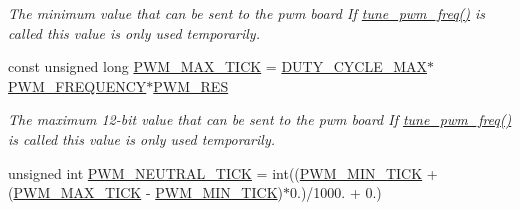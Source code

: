 \begin{DoxyCompactItemize}
\begin{DoxyCompactList}\small\item\em The minimum value that can be sent to the pwm board If \hyperlink{svea__arduino__src_8h_ab3d64504be0ebfe1754aec5485ddbb72}{tune\+\_\+pwm\+\_\+freq()} is called this value is only used temporarily. \end{DoxyCompactList}\item 
const unsigned long \hyperlink{group__ActuationToOutput_ga5538377a8c17947a2f35bfd31e7399fa}{P\+W\+M\+\_\+\+M\+A\+X\+\_\+\+T\+I\+CK} = \hyperlink{group__ActuationToOutput_ga716fdda2246d4b15a6b8d32444ac8439}{D\+U\+T\+Y\+\_\+\+C\+Y\+C\+L\+E\+\_\+\+M\+AX}$\ast$\hyperlink{group__ActuationToOutput_ga1e7ca795ca78a0b20f4fbc06ea505cfb}{P\+W\+M\+\_\+\+F\+R\+E\+Q\+U\+E\+N\+CY}$\ast$\hyperlink{group__ActuationToOutput_ga3de5d6c408f667c395ab2b236e059724}{P\+W\+M\+\_\+\+R\+ES}\hypertarget{group__ActuationToOutput_ga5538377a8c17947a2f35bfd31e7399fa}{}\label{group__ActuationToOutput_ga5538377a8c17947a2f35bfd31e7399fa}

\begin{DoxyCompactList}\small\item\em The maximum 12-\/bit value that can be sent to the pwm board If \hyperlink{svea__arduino__src_8h_ab3d64504be0ebfe1754aec5485ddbb72}{tune\+\_\+pwm\+\_\+freq()} is called this value is only used temporarily. \end{DoxyCompactList}\item 
unsigned int \hyperlink{group__ActuationToOutput_gaa6aecad7bb848a436df0b7c89aa1f48f}{P\+W\+M\+\_\+\+N\+E\+U\+T\+R\+A\+L\+\_\+\+T\+I\+CK} = int((\hyperlink{group__ActuationToOutput_ga606bf90e7566da13c2e4c3d2ef163e6b}{P\+W\+M\+\_\+\+M\+I\+N\+\_\+\+T\+I\+CK} + (\hyperlink{group__ActuationToOutput_ga5538377a8c17947a2f35bfd31e7399fa}{P\+W\+M\+\_\+\+M\+A\+X\+\_\+\+T\+I\+CK} -\/ \hyperlink{group__ActuationToOutput_ga606bf90e7566da13c2e4c3d2ef163e6b}{P\+W\+M\+\_\+\+M\+I\+N\+\_\+\+T\+I\+CK})$\ast$0.)/1000. + 0.)\hypertarget{group__ActuationToOutput_gaa6aecad7bb848a436df0b7c89aa1f48f}{}\label{group__ActuationToOutput_gaa6aecad7bb848a436df0b7c89aa1f48f}


\end{DoxyCompactItemize}
